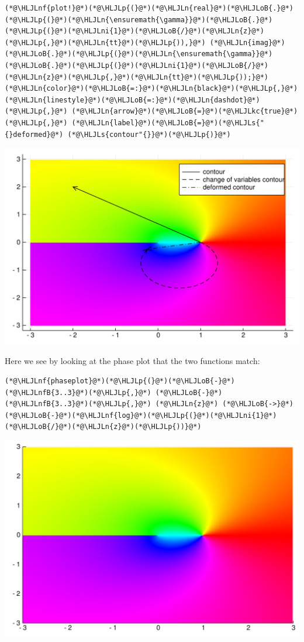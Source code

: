 \documentclass[12pt,a4paper]{article}
\newcommand{\HLJLkc}[1]{\textcolor[RGB]{59,151,46}{\textit{#1}}}
\newcommand{\HLJLn}[1]{#1}
\newcommand{\HLJLnf}[1]{\textcolor[RGB]{66,102,213}{#1}}
\newcommand{\HLJLs}[1]{\textcolor[RGB]{201,61,57}{#1}}
\newcommand{\HLJLnfB}[1]{\textcolor[RGB]{59,151,46}{#1}}
\newcommand{\HLJLni}[1]{\textcolor[RGB]{59,151,46}{#1}}
\newcommand{\HLJLoB}[1]{\textcolor[RGB]{102,102,102}{\textbf{#1}}}
\newcommand{\HLJLp}[1]{#1}
\begin{document}
\begin{lstlisting}
(*@\HLJLnf{plot!}@*)(*@\HLJLp{(}@*)(*@\HLJLn{real}@*)(*@\HLJLoB{.}@*)(*@\HLJLp{(}@*)(*@\HLJLn{\ensuremath{\gamma}}@*)(*@\HLJLoB{.}@*)(*@\HLJLp{(}@*)(*@\HLJLni{1}@*)(*@\HLJLoB{/}@*)(*@\HLJLn{z}@*)(*@\HLJLp{,}@*)(*@\HLJLn{tt}@*)(*@\HLJLp{)),}@*) (*@\HLJLn{imag}@*)(*@\HLJLoB{.}@*)(*@\HLJLp{(}@*)(*@\HLJLn{\ensuremath{\gamma}}@*)(*@\HLJLoB{.}@*)(*@\HLJLp{(}@*)(*@\HLJLni{1}@*)(*@\HLJLoB{/}@*)(*@\HLJLn{z}@*)(*@\HLJLp{,}@*)(*@\HLJLn{tt}@*)(*@\HLJLp{));}@*) (*@\HLJLn{color}@*)(*@\HLJLoB{=:}@*)(*@\HLJLn{black}@*)(*@\HLJLp{,}@*) (*@\HLJLn{linestyle}@*)(*@\HLJLoB{=:}@*)(*@\HLJLn{dashdot}@*)(*@\HLJLp{,}@*) (*@\HLJLn{arrow}@*)(*@\HLJLoB{=}@*)(*@\HLJLkc{true}@*)(*@\HLJLp{,}@*) (*@\HLJLn{label}@*)(*@\HLJLoB{=}@*)(*@\HLJLs{"{}deformed}@*) (*@\HLJLs{contour"{}}@*)(*@\HLJLp{)}@*)
\end{lstlisting}

\includegraphics[width=\linewidth]{figures/Lecture10_5_1.pdf}

Here we see by looking at the phase plot that the two functions match:


\begin{lstlisting}
(*@\HLJLnf{phaseplot}@*)(*@\HLJLp{(}@*)(*@\HLJLoB{-}@*)(*@\HLJLnfB{3..3}@*)(*@\HLJLp{,}@*) (*@\HLJLoB{-}@*)(*@\HLJLnfB{3..3}@*)(*@\HLJLp{,}@*) (*@\HLJLn{z}@*) (*@\HLJLoB{->}@*) (*@\HLJLoB{-}@*)(*@\HLJLnf{log}@*)(*@\HLJLp{(}@*)(*@\HLJLni{1}@*)(*@\HLJLoB{/}@*)(*@\HLJLn{z}@*)(*@\HLJLp{))}@*)
\end{lstlisting}

\includegraphics[width=\linewidth]{figures/Lecture10_6_1.pdf}
\end{document}
